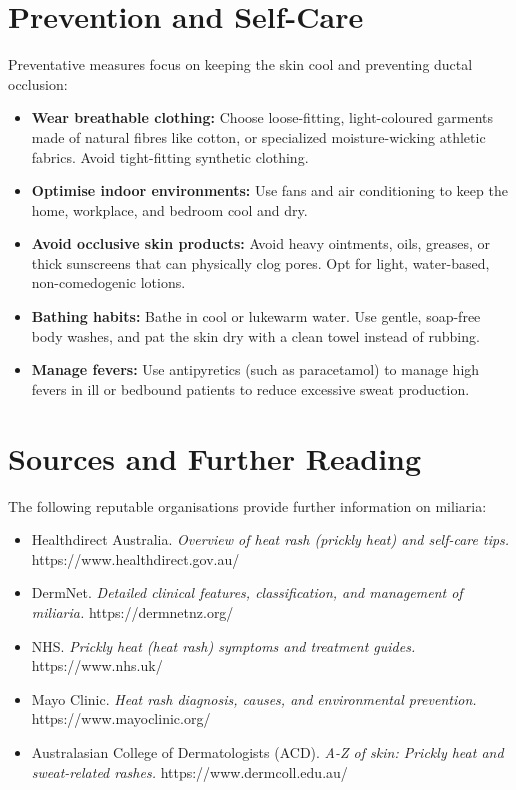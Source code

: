 \section*{Prevention and Self-Care}
Preventative measures focus on keeping the skin cool and preventing ductal occlusion:
\begin{itemize}
    \item \textbf{Wear breathable clothing:} Choose loose-fitting, light-coloured garments made of natural fibres like cotton, or specialized moisture-wicking athletic fabrics. Avoid tight-fitting synthetic clothing.
    \item \textbf{Optimise indoor environments:} Use fans and air conditioning to keep the home, workplace, and bedroom cool and dry.
    \item \textbf{Avoid occlusive skin products:} Avoid heavy ointments, oils, greases, or thick sunscreens that can physically clog pores. Opt for light, water-based, non-comedogenic lotions.
    \item \textbf{Bathing habits:} Bathe in cool or lukewarm water. Use gentle, soap-free body washes, and pat the skin dry with a clean towel instead of rubbing.
    \item \textbf{Manage fevers:} Use antipyretics (such as paracetamol) to manage high fevers in ill or bedbound patients to reduce excessive sweat production.
\end{itemize}

\section*{Sources and Further Reading}
The following reputable organisations provide further information on miliaria:
\begin{itemize}
    \item Healthdirect Australia. \textit{Overview of heat rash (prickly heat) and self-care tips.} https://www.healthdirect.gov.au/
    \item DermNet. \textit{Detailed clinical features, classification, and management of miliaria.} https://dermnetnz.org/
    \item NHS. \textit{Prickly heat (heat rash) symptoms and treatment guides.} https://www.nhs.uk/
    \item Mayo Clinic. \textit{Heat rash diagnosis, causes, and environmental prevention.} https://www.mayoclinic.org/
    \item Australasian College of Dermatologists (ACD). \textit{A-Z of skin: Prickly heat and sweat-related rashes.} https://www.dermcoll.edu.au/
\end{itemize}
